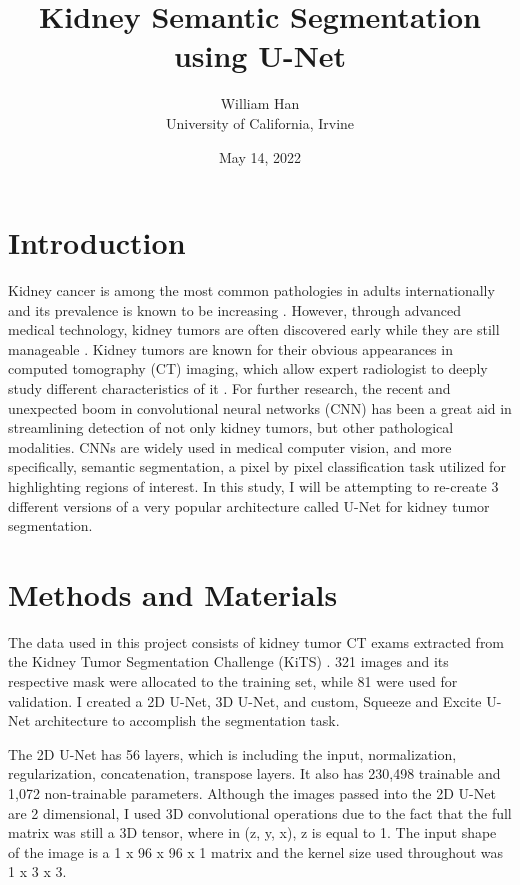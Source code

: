 \documentclass [12pt, letterpaper] {article}
\title{Kidney Semantic Segmentation using U-Net}
\author{William Han \\ University of California, Irvine}
\date{May 14, 2022}
\begin{document}
\maketitle

\section{Introduction}

Kidney cancer is among the most common pathologies in adults internationally and its prevalence is known to be increasing \cite{1}. However, through advanced medical technology, kidney tumors are often discovered early while they are still manageable \cite{1}. Kidney tumors are known for their obvious appearances in computed tomography (CT) imaging, which allow expert radiologist to deeply study different characteristics of it \cite{1}. For further research, the recent and unexpected boom in convolutional neural networks (CNN) has been a great aid in streamlining detection of not only kidney tumors, but other pathological modalities. CNNs are widely used in medical computer vision, and more specifically, semantic segmentation, a pixel by pixel classification task utilized for highlighting regions of interest. In this study, I will be attempting to re-create 3 different versions of a very popular architecture called U-Net \cite{2} for kidney tumor segmentation.  
\section{Methods and Materials }

The data used in this project consists of kidney tumor CT exams extracted from the Kidney Tumor Segmentation Challenge (KiTS) \cite{1}. 321 images and its respective mask were allocated to the training set, while 81 were used for validation. I created a 2D U-Net, 3D U-Net, and custom, Squeeze and Excite \cite{3} U-Net architecture to accomplish the segmentation task. 

The 2D U-Net has 56 layers, which is including the input, normalization, regularization, concatenation, transpose layers. It also has 230,498 trainable and 1,072 non-trainable parameters. Although the images passed into the 2D U-Net are 2 dimensional, I used 3D convolutional operations due to the fact that the full matrix was still a 3D tensor, where in (z, y, x), z is equal to 1. The input shape of the image is a 1 x 96 x 96 x 1 matrix and the kernel size used throughout was 1 x 3 x 3. 
\end{document}
